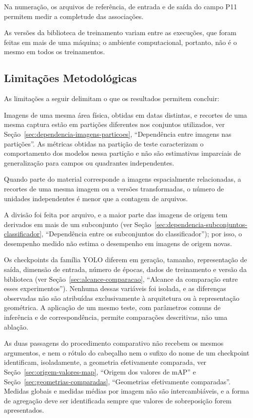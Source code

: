 Na numera\c{c}\~ao, os arquivos de refer\^encia, de entrada e de sa\'ida do campo P11 permitem medir a completude das associa\c{c}\~oes.

As vers\~oes da biblioteca de treinamento variam entre as execu\c{c}\~oes, que foram feitas em mais de uma m\'aquina; o ambiente computacional, portanto, n\~ao \'e o mesmo em todos os treinamentos.

\subsection*{Limita\c{c}\~oes Metodol\'ogicas}

As limita\c{c}\~oes a seguir delimitam o que os resultados permitem concluir:

Imagens de uma mesma \'area f\'isica, obtidas em datas distintas, e recortes de uma mesma captura est\~ao em parti\c{c}\~oes diferentes nos conjuntos utilizados, ver Se\c{c}\~ao~\ref{sec:dependencia-imagens-particoes}, ``Depend\^encia entre imagens nas parti\c{c}\~oes''. As m\'etricas obtidas na parti\c{c}\~ao de teste caracterizam o comportamento dos modelos nessa parti\c{c}\~ao e n\~ao s\~ao estimativas imparciais de generaliza\c{c}\~ao para campos ou quadrantes independentes.

Quando parte do material corresponde a imagens espacialmente relacionadas, a recortes de uma mesma imagem ou a vers\~oes transformadas, o n\'umero de unidades independentes \'e menor que a contagem de arquivos.

A divis\~ao foi feita por arquivo, e a maior parte das imagens de origem tem derivados em mais de um subconjunto (ver Se\c{c}\~ao~\ref{sec:dependencia-subconjuntos-classificador}, ``Depend\^encia entre os subconjuntos do classificador''); por isso, o desempenho medido n\~ao estima o desempenho em imagens de origem novas.

Os checkpoints da fam\'ilia YOLO diferem em gera\c{c}\~ao, tamanho, representa\c{c}\~ao de sa\'ida, dimens\~ao de entrada, n\'umero de \'epocas, dados de treinamento e vers\~ao da biblioteca (ver Se\c{c}\~ao~\ref{sec:alcance-comparacao}, ``Alcance da compara\c{c}\~ao entre esses experimentos''). Nenhuma dessas vari\'aveis foi isolada, e as diferen\c{c}as observadas n\~ao s\~ao atribu\'idas exclusivamente \`a arquitetura ou \`a representa\c{c}\~ao geom\'etrica. A aplica\c{c}\~ao de um mesmo teste, com par\^ametros comuns de infer\^encia e de correspond\^encia, permite compara\c{c}\~oes descritivas, n\~ao uma abla\c{c}\~ao.

As duas passagens do procedimento comparativo n\~ao recebem os mesmos argumentos, e nem o r\'otulo do cabe\c{c}alho nem o sufixo do nome de um checkpoint identificam, isoladamente, a geometria efetivamente comparada, ver Se\c{c}\~ao~\ref{sec:origem-valores-map}, ``Origem dos valores de mAP'' e Se\c{c}\~ao~\ref{sec:geometrias-comparadas}, ``Geometrias efetivamente comparadas''. Medidas globais e medidas m\'edias por imagem n\~ao s\~ao intercambi\'aveis, e a forma de agrega\c{c}\~ao deve ser identificada sempre que valores de sobreposi\c{c}\~ao forem apresentados.

